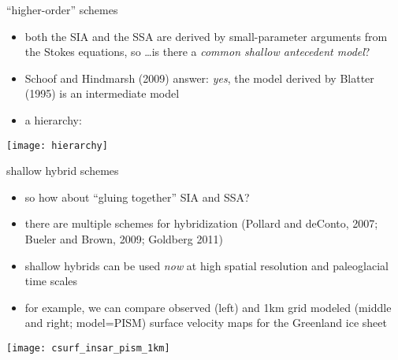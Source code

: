 \begin{frame}{``higher-order'' schemes}

\begin{itemize}
\item both the SIA and the SSA are derived by small-parameter arguments from the Stokes equations, so \dots is there a \emph{common shallow antecedent model}?
\item Schoof and Hindmarsh (2009)\nocite{SchoofHindmarsh} answer:  \emph{yes}, the model derived by Blatter (1995)\nocite{Blatter} is an intermediate model
\item a hierarchy:
\end{itemize}
\begin{center}
\texttt{[image: hierarchy]}
\end{center}
\end{frame}


\begin{frame}{shallow hybrid schemes}

\begin{itemize}
\item so how about ``gluing together'' SIA and SSA?
\item there are multiple schemes for hybridization (Pollard and deConto, 2007\nocite{PollardDeConto}; Bueler and Brown, 2009\nocite{BBssasliding}; Goldberg 2011\nocite{Goldberg2011})
\item shallow hybrids can be used \emph{now} at high spatial resolution and paleoglacial time scales
\item for example, we can compare observed (left) and 1km grid modeled (middle and right; model=PISM) surface velocity maps for the Greenland ice sheet
\end{itemize}

\vspace{-4mm}
\begin{center}
\texttt{[image: csurf\_insar\_pism\_1km]}
\end{center}
\end{frame}
